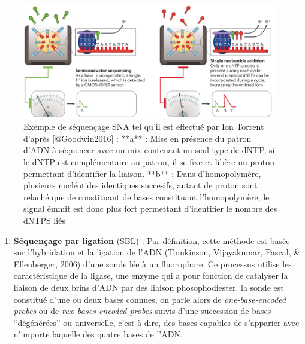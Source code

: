 \documentclass[12pt,twoside]{reedthesis}
\providecommand{\tightlist}{%
  \setlength{\itemsep}{0pt}\setlength{\parskip}{0pt}}
\theoremstyle{definition}
\theoremstyle{definition}
\theoremstyle{remark}
\begin{document}
  \begin{figure}
  
  {\centering \includegraphics[scale=.26]{figure/SNA_seq_ionTorrent} 
  
  }
  
  \caption[Exemple de séquençage SNA tel qu'il est effectué par Ion Torrent]{Exemple de séquençage SNA tel qu'il est effectué par Ion Torrent d'après [@Goodwin2016] : **a** : Mise en présence du patron d'ADN à séquencer avec un mix contenant un seul type de dNTP, si le dNTP est complémentaire au patron, il se fixe et libère un proton permettant d'identifier la liaison. **b** : Dans d'homopolymère, plusieurs nucléotides identiques succesifs, autant de proton sont relaché que de constituant de bases constituant l'homopolymère, le signal émmit est donc plus fort permettant d'identifier le nombre des dNTPS liés}\label{fig:snaSeq}
  \end{figure}
  
  \begin{enumerate}
  \def\labelenumi{\arabic{enumi}.}
  \setcounter{enumi}{1}
  \tightlist
  \item
    \textbf{Séquençage par ligation} (SBL) : Par définition, cette méthode
    est basée sur l'hybridation et la ligation de l'ADN (Tomkinson,
    Vijayakumar, Pascal, \& Ellenberger, 2006) d'une sonde lée à un
    fluorophore. Ce processus utilise les caractéristique de la ligase,
    une enzyme qui a pour fonction de catalyser la liaison de deux brins
    d'ADN par des liaison phosophodiester. la sonde est constitué d'une ou
    deux bases connues, on parle alors de \emph{one-base-encoded probes}
    ou de \emph{two-bases-encoded probes} suivis d'une succession de bases
    ``dégénérées'' ou universelle, c'est à dire, des bases capables de
    s'apparier avec n'importe laquelle des quatre bases de l'ADN.
  \end{enumerate}
  
\end{document}
